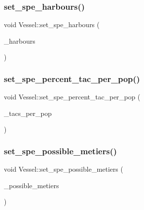 \mbox{\label{class_vessel_a1f349b933fa117b199d6b953820a88e9}} 
\subsubsection{\texorpdfstring{set\_spe\_harbours()}{set\_spe\_harbours()}}
{\footnotesize\ttfamily void Vessel\+::set\+\_\+spe\+\_\+harbours (\begin{DoxyParamCaption}\item[{const std\+::vector$<$ \mbox{\hyperlink{classtypes_1_1_node_id}{types\+::\+Node\+Id}} $>$ \&}]{\+\_\+harbours }\end{DoxyParamCaption})}

\mbox{\label{class_vessel_a57058770aaef0db7180b6f90e9eddeed}} 
\subsubsection{\texorpdfstring{set\_spe\_percent\_tac\_per\_pop()}{set\_spe\_percent\_tac\_per\_pop()}}
{\footnotesize\ttfamily void Vessel\+::set\+\_\+spe\+\_\+percent\+\_\+tac\+\_\+per\+\_\+pop (\begin{DoxyParamCaption}\item[{const std\+::vector$<$ double $>$ \&}]{\+\_\+tacs\+\_\+per\+\_\+pop }\end{DoxyParamCaption})}

\mbox{\label{class_vessel_a582e7c58e3f27b4aad1d501e4c2184d5}} 
\subsubsection{\texorpdfstring{set\_spe\_possible\_metiers()}{set\_spe\_possible\_metiers()}}
{\footnotesize\ttfamily void Vessel\+::set\+\_\+spe\+\_\+possible\+\_\+metiers (\begin{DoxyParamCaption}\item[{const std\+::multimap$<$ \mbox{\hyperlink{classtypes_1_1_node_id}{types\+::\+Node\+Id}}, int $>$ \&}]{\+\_\+possible\+\_\+metiers }\end{DoxyParamCaption})}

